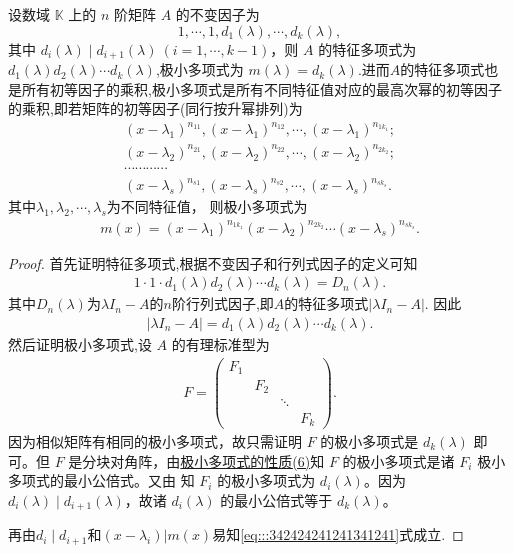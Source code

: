\documentclass[../../main.tex]{subfiles}%
\begin{document}
\begin{theorem}[极小多项式就是幂次最大的不变因子]\label{theorem:极小多项式与不变因子的关系}
设数域 $\mathbb{K}$ 上的 $n$ 阶矩阵 $A$ 的不变因子为
\[
1,\cdots,1,d_1(\lambda),\cdots,d_k(\lambda),
\]
其中 $d_i(\lambda)\mid d_{i + 1}(\lambda)\ (i = 1,\cdots,k - 1)$，则 $A$ 的特征多项式为$d_1(\lambda)d_2(\lambda)\cdots d_k(\lambda)$,极小多项式为 $m(\lambda)=d_k(\lambda)$.进而$A$的特征多项式也是所有初等因子的乘积,极小多项式是所有不同特征值对应的最高次幂的初等因子的乘积,即若矩阵的初等因子(同行按升幂排列)为
\begin{gather*}
(x-\lambda _1)^{n_{11}},(x-\lambda _1)^{n_{12}},\cdots ,(x-\lambda _1)^{n_{1k_1}}; 
\\
(x-\lambda _2)^{n_{21}},(x-\lambda _2)^{n_{22}},\cdots ,(x-\lambda _2)^{n_{2k_2}}; 
\\
\cdots \cdots \cdots \cdots 
\\
(x-\lambda _s)^{n_{s1}},(x-\lambda _s)^{n_{s2}},\cdots ,(x-\lambda _s)^{n_{sk_s}}.
\end{gather*}
其中\(\lambda_1,\lambda_2,\cdots,\lambda_s\)为不同特征值，
则极小多项式为
\begin{align}\label{eq:::342424241241341241}
m(x)=(x-\lambda _1)^{n_{1k_1}}(x-\lambda _2)^{n_{2k_2}}\cdots (x-\lambda _s)^{n_{sk_s}}.
\end{align}
\end{theorem}
\begin{proof}
首先证明特征多项式,根据不变因子和行列式因子的定义可知
\begin{align*}
1\cdot 1\cdot d_1(\lambda)d_2(\lambda)\cdots d_k(\lambda)=D_n(\lambda).
\end{align*}
其中$D_n(\lambda)$为$\lambda I_n-A$的$n$阶行列式因子,即$A$的特征多项式$|\lambda I_n-A|$.
因此
\begin{align*}
|\lambda I_n-A|=d_1(\lambda)d_2(\lambda)\cdots d_k(\lambda).
\end{align*}
然后证明极小多项式,设 $A$ 的有理标准型为
\begin{align*}
F = \begin{pmatrix}
F_1 & & & \\
& F_2 & & \\
& & \ddots & \\
& & & F_k
\end{pmatrix}.
\end{align*}
因为相似矩阵有相同的极小多项式，故只需证明 $F$ 的极小多项式是 $d_k(\lambda)$ 即可。但 $F$ 是分块对角阵，由\hyperref[proposition:极小多项式的性质]{极小多项式的性质(6)}知 $F$ 的极小多项式是诸 $F_i$ 极小多项式的最小公倍式。又由 知 $F_i$ 的极小多项式为 $d_i(\lambda)$。因为 $d_i(\lambda)\mid d_{i + 1}(\lambda)$，故诸 $d_i(\lambda)$ 的最小公倍式等于 $d_k(\lambda)$。

再由$d_i\mid d_{i+1}$和$(x-\lambda_i)|m(x)$易知\eqref{eq:::342424241241341241}式成立.
\end{proof}
\end{document}

